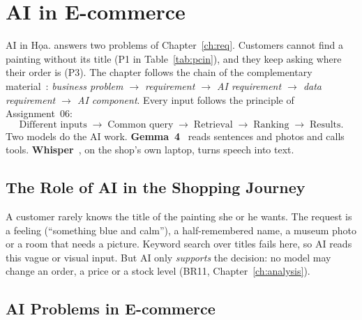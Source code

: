 \chapter{AI in E-commerce}\label{ch:ai}
\providecommand{\specrow}[2]{\small\textbf{#1} & \small #2\\}

AI in Họa. answers two problems of Chapter~\ref{ch:req}. Customers cannot find a painting without its title (P1 in
Table~\ref{tab:pcin}), and they keep asking where their order is (P3). The chapter follows the chain of the
complementary material~\cite{aianalysis}: \emph{business problem $\rightarrow$ requirement $\rightarrow$ AI
requirement $\rightarrow$ data requirement $\rightarrow$ AI component}. Every input follows the principle of
Assignment~06:
\begin{equation}
\text{Different inputs} \;\to\; \text{Common query} \;\to\; \text{Retrieval} \;\to\; \text{Ranking}
\;\to\; \text{Results.}
\label{eq:a06pipeline}
\end{equation}
Two models do the AI work. \textbf{Gemma~4}~\cite{gemma,vllm} reads sentences and photos and calls tools.
\textbf{Whisper}~\cite{whisper,fasterwhisper}, on the shop's own laptop, turns speech into text.

\section{The Role of AI in the Shopping Journey}\label{sec:3.1}

A customer rarely knows the title of the painting she or he wants. The request is a feeling (``something blue and
calm''), a half-remembered name, a museum photo or a room that needs a picture. Keyword search over titles fails here,
so AI reads this vague or visual input. But AI only \emph{supports} the decision: no model may change an order, a
price or a stock level (BR11, Chapter~\ref{ch:analysis}).

\section{AI Problems in E-commerce}\label{sec:3.2}

